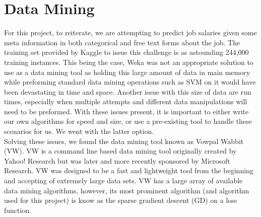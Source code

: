 \section{Data Mining}
\label{sec:dm}

For this project, to reiterate, we are attempting to predict job salaries given some meta information in both categorical and free text forms
about the job. The training set provided by Kaggle to issue this challenge is as astounding 244,000 training instances. This being the case,
Weka was not an appropriate solution to use as a data mining tool as holding this large amount of data in main memory while preforming standard
data mining operations such as SVM on it would have been devastating in time and space. Another issue with this size of data are run times, especially when 
multiple attempts and different data manipulations will need to be preformed. With these issues present, it is important to either write
our own algorithms for speed and size, or use a pre-existing tool to handle these scenarios for us. We went with the latter option.\\

Solving these issues, we found the data mining tool known as Vowpal Wabbit (VW). VW is a command line based data mining tool originally
created by Yahoo! Research but was later and more recently sponsored by Microsoft Research. VW was designed to be a fast and lightweight
tool from the beginning and accepting of extremely large data sets. VW has a large array of available data mining algorithms, however,
its most prominent algorithm (and algorithm used for this project) is know as the sparse gradient descent (GD) on a loss function.\\

